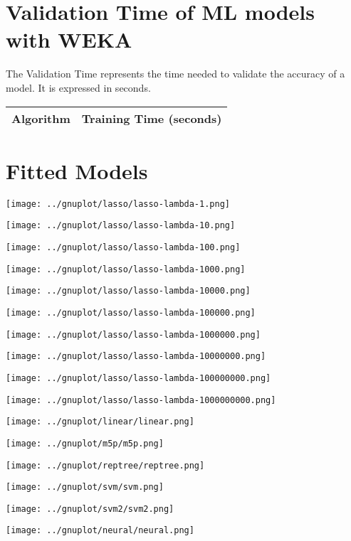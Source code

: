 \documentclass[10pt,a4paper]{article}
\begin{document}
\section{Validation Time of ML models with WEKA }

The Validation Time represents the time needed to validate the accuracy of a model. It is expressed in seconds.

\begin{center}
\begin{tabular}{cc}
\toprule
\textbf{Algorithm} & \textbf{Training Time (seconds)} \\
\midrule

\bottomrule
\end{tabular}
\end{center}



\section{Fitted Models}

\texttt{[image: ../gnuplot/lasso/lasso-lambda-1.png]}

\texttt{[image: ../gnuplot/lasso/lasso-lambda-10.png]}

\texttt{[image: ../gnuplot/lasso/lasso-lambda-100.png]}

\texttt{[image: ../gnuplot/lasso/lasso-lambda-1000.png]}

\texttt{[image: ../gnuplot/lasso/lasso-lambda-10000.png]}

\texttt{[image: ../gnuplot/lasso/lasso-lambda-100000.png]}

\texttt{[image: ../gnuplot/lasso/lasso-lambda-1000000.png]}

\texttt{[image: ../gnuplot/lasso/lasso-lambda-10000000.png]}

\texttt{[image: ../gnuplot/lasso/lasso-lambda-100000000.png]}

\texttt{[image: ../gnuplot/lasso/lasso-lambda-1000000000.png]}

\texttt{[image: ../gnuplot/linear/linear.png]}

\texttt{[image: ../gnuplot/m5p/m5p.png]}

\texttt{[image: ../gnuplot/reptree/reptree.png]}

\texttt{[image: ../gnuplot/svm/svm.png]}

\texttt{[image: ../gnuplot/svm2/svm2.png]}

\texttt{[image: ../gnuplot/neural/neural.png]}
\end{document}
